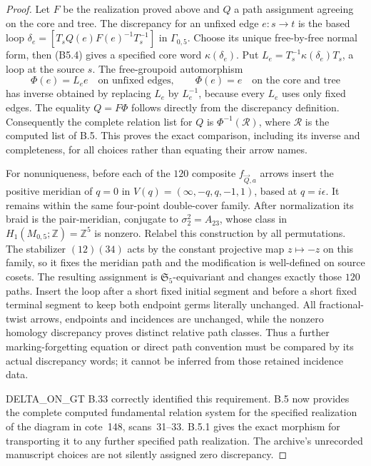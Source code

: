 \begin{proof}
Let $F$ be the realization proved above and $Q$ a path assignment
agreeing on the core and tree.  The discrepancy for an unfixed edge
$e:s\to t$ is the based loop
$\delta_e=[T_sQ(e)F(e)^{-1}T_s^{-1}]$ in $\Gamma_{0,5}$.
Choose its unique free-by-free normal form, then (B5.4) gives a
specified core word $\kappa(\delta_e)$.  Put
$L_e=T_s^{-1}\kappa(\delta_e)T_s$, a loop at the source $s$.
The free-groupoid automorphism
\[
 \Phi(e)=L_e e\quad\text{on unfixed edges},\qquad
 \Phi(e)=e\quad\text{on the core and tree}
\]
has inverse obtained by replacing $L_e$ by $L_e^{-1}$, because every
$L_e$ uses only fixed edges.  The equality $Q=F\Phi$ follows directly
from the discrepancy definition.  Consequently the complete relation
list for $Q$ is $\Phi^{-1}(\mathcal R)$, where $\mathcal R$ is the
computed list of B.5.  This proves the exact comparison, including its
inverse and completeness, for all choices rather than equating their
arrow names.

For nonuniqueness, before each of the $120$ composite $f_{\vec Q,a}$
arrows insert the positive meridian of $q=0$ in
$V(q)=(\infty,-q,q,-1,1)$, based at $q=i\epsilon$.
It remains within the same four-point double-cover family.  After
normalization its braid is the pair-meridian, conjugate to
$\sigma_2^2=A_{23}$, whose class in
$H_1(M_{0,5};\mathbb Z)=\mathbb Z^5$ is nonzero.
Relabel this construction by all permutations.  The stabilizer
$(12)(34)$ acts by the constant projective map $z\mapsto-z$ on this
family, so it fixes the meridian path and the modification is
well-defined on source cosets.  The resulting assignment is
$\mathfrak S_5$-equivariant and changes exactly those $120$ paths.
Insert the loop after a short fixed initial segment and before a short
fixed terminal segment to keep both endpoint germs literally unchanged.
All fractional-twist arrows, endpoints and incidences are unchanged,
while the nonzero homology discrepancy proves distinct relative path
classes.  Thus a further marking-forgetting equation or direct path
convention must be compared by its actual discrepancy words; it cannot
be inferred from those retained incidence data.

DELTA\_ON\_GT B.33 correctly identified this requirement.  B.5 now
provides the complete computed fundamental relation system for the
specified realization of the diagram in cote~148, scans~31--33.
B.5.1 gives the exact morphism for transporting it to any further
specified path realization.  The archive's unrecorded manuscript
choices are not silently assigned zero discrepancy.
\end{proof}

